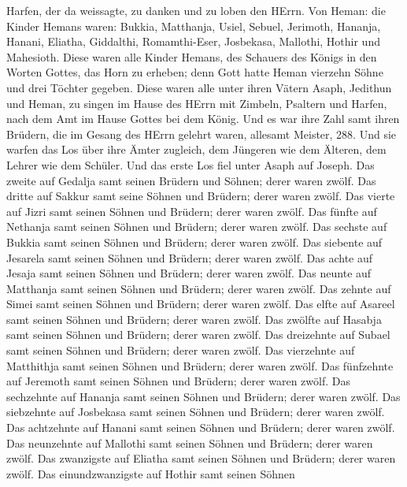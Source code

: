 Harfen, der da weissagte, zu danken und zu loben den HErrn. 
Von Heman: die Kinder Hemans waren: Bukkia, Matthanja, Usiel, Sebuel,
Jerimoth, Hananja, Hanani, Eliatha, Giddalthi, Romamthi-Eser, Josbekasa,
Mallothi, Hothir und Mahesioth.  Diese waren alle Kinder
Hemans, des Schauers des Königs in den Worten Gottes, das Horn zu
erheben; denn Gott hatte Heman vierzehn Söhne und drei Töchter gegeben.
 Diese waren alle unter ihren Vätern Asaph, Jedithun und
Heman, zu singen im Hause des HErrn mit Zimbeln, Psaltern und Harfen,
nach dem Amt im Hause Gottes bei dem König.  Und es war ihre
Zahl samt ihren Brüdern, die im Gesang des HErrn gelehrt waren, allesamt
Meister, 288.  Und sie warfen das Los über ihre Ämter
zugleich, dem Jüngeren wie dem Älteren, dem Lehrer wie dem Schüler.
 Und das erste Los fiel unter Asaph auf Joseph. Das zweite
auf Gedalja samt seinen Brüdern und Söhnen; derer waren zwölf.
 Das dritte auf Sakkur samt seine Söhnen und Brüdern; derer
waren zwölf.  Das vierte auf Jizri samt seinen Söhnen und
Brüdern; derer waren zwölf.  Das fünfte auf Nethanja samt
seinen Söhnen und Brüdern; derer waren zwölf.  Das sechste
auf Bukkia samt seinen Söhnen und Brüdern; derer waren zwölf.
 Das siebente auf Jesarela samt seinen Söhnen und Brüdern;
derer waren zwölf.  Das achte auf Jesaja samt seinen Söhnen
und Brüdern; derer waren zwölf.  Das neunte auf Matthanja
samt seinen Söhnen und Brüdern; derer waren zwölf.  Das
zehnte auf Simei samt seinen Söhnen und Brüdern; derer waren zwölf.
 Das elfte auf Asareel samt seinen Söhnen und Brüdern;
derer waren zwölf.  Das zwölfte auf Hasabja samt seinen
Söhnen und Brüdern; derer waren zwölf.  Das dreizehnte auf
Subael samt seinen Söhnen und Brüdern; derer waren zwölf. 
Das vierzehnte auf Matthithja samt seinen Söhnen und Brüdern; derer
waren zwölf.  Das fünfzehnte auf Jeremoth samt seinen
Söhnen und Brüdern; derer waren zwölf.  Das sechzehnte auf
Hananja samt seinen Söhnen und Brüdern; derer waren zwölf. 
Das siebzehnte auf Josbekasa samt seinen Söhnen und Brüdern; derer waren
zwölf.  Das achtzehnte auf Hanani samt seinen Söhnen und
Brüdern; derer waren zwölf.  Das neunzehnte auf Mallothi
samt seinen Söhnen und Brüdern; derer waren zwölf.  Das
zwanzigste auf Eliatha samt seinen Söhnen und Brüdern; derer waren
zwölf.  Das einundzwanzigste auf Hothir samt seinen Söhnen
